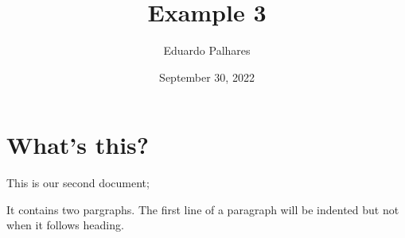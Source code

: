 \documentclass[a4paper, 11pt]{article}
\begin{document}
  \title{Example 3}
  \author{Eduardo Palhares}
  \date{September 30, 2022}
  \maketitle
  \section{What's this?}
    This is our second document;

    It contains two pargraphs. The first line of a paragraph will be
    indented but not when it follows heading.
\end{document}
